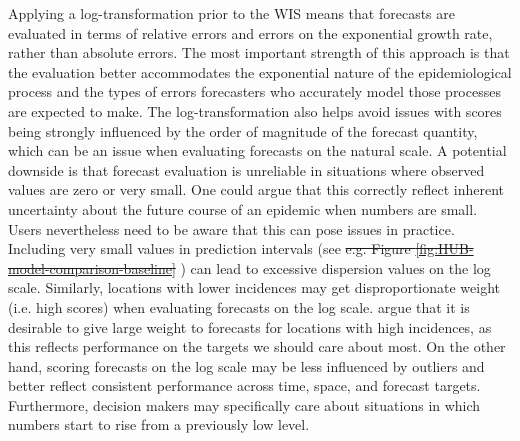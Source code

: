 \documentclass[10pt,letterpaper]{article} %
\providecommand{\DIFaddtex}[1]{{\protect\color{blue}\uwave{#1}}} %
\providecommand{\DIFdeltex}[1]{{\protect\color{red}\sout{#1}}}                      %
\providecommand{\DIFaddbegin}{} %
\providecommand{\DIFaddend}{} %
\providecommand{\DIFdelbegin}{} %
\providecommand{\DIFdelend}{} %
\providecommand{\DIFadd}[1]{\texorpdfstring{\DIFaddtex{#1}}{#1}} %
\providecommand{\DIFdel}[1]{\texorpdfstring{\DIFdeltex{#1}}{}} %
\newcommand{\DIFscaledelfig}{0.5}
\newlength{\DIFdelgraphicswidth} %
\newlength{\DIFdelgraphicsheight} %
\newcommand{\DIFaddincludegraphics}[2][]{{\color{blue}\fbox{\DIFOincludegraphics[#1]{#2}}}} %
\newcommand{\DIFdelincludegraphics}[2][]{%
\sbox{\DIFdelgraphicsbox}{\DIFOincludegraphics[#1]{#2}}%
\settoboxwidth{\DIFdelgraphicswidth}{\DIFdelgraphicsbox} %
\settoboxtotalheight{\DIFdelgraphicsheight}{\DIFdelgraphicsbox} %
\scalebox{\DIFscaledelfig}{%
\parbox[b]{\DIFdelgraphicswidth}{\usebox{\DIFdelgraphicsbox}\\[-\baselineskip] \rule{\DIFdelgraphicswidth}{0em}}\llap{\resizebox{\DIFdelgraphicswidth}{\DIFdelgraphicsheight}{%
\setlength{\unitlength}{\DIFdelgraphicswidth}%
\begin{picture}(1,1)%
\thicklines\linethickness{2pt} %
{\color[rgb]{1,0,0}\put(0,0){\framebox(1,1){}}}%
{\color[rgb]{1,0,0}\put(0,0){\line( 1,1){1}}}%
{\color[rgb]{1,0,0}\put(0,1){\line(1,-1){1}}}%
\end{picture}%
}\hspace*{3pt}}} %
} %
\DeclareRobustCommand{\DIFaddbegin}{\DIFOaddbegin \let\includegraphics\DIFaddincludegraphics} %
\DeclareRobustCommand{\DIFaddend}{\DIFOaddend \let\includegraphics\DIFOincludegraphics} %
\DeclareRobustCommand{\DIFdelbegin}{\DIFOdelbegin \let\includegraphics\DIFdelincludegraphics} %
\DeclareRobustCommand{\DIFdelend}{\DIFOaddend \let\includegraphics\DIFOincludegraphics} %
\begin{document}
Applying a log-transformation prior to the WIS means that forecasts are evaluated in terms of relative errors and errors on the exponential growth rate, rather than absolute errors. The most important strength of this approach is that the evaluation better accommodates the exponential nature of the epidemiological process and the types of errors forecasters who accurately model those processes are expected to make. The log-transformation also helps avoid issues with scores being strongly influenced by the order of magnitude of the forecast quantity, which can be an issue when evaluating forecasts on the natural scale. 
A potential downside is that forecast evaluation is unreliable in situations where observed values are zero or very small. One could argue that this correctly reflect inherent uncertainty about the future course of an epidemic when numbers are small. Users nevertheless need to be aware that this can pose issues in practice. Including very small values in prediction intervals (see \DIFdelbegin \DIFdel{e.g. Figure \ref{fig:HUB-model-comparison-baseline}}\DIFdelend \DIFaddbegin {} \DIFadd{for an example}\DIFaddend ) can lead to excessive dispersion values on the log scale. 
Similarly, locations with lower incidences may get disproportionate weight (i.e. high scores) when evaluating forecasts on the log scale. \cite{bracherEvaluatingEpidemicForecasts2021} argue that it is desirable to give large weight to forecasts for locations with high incidences, as this reflects performance on the targets we should care about most. On the other hand, scoring forecasts on the log scale may be less influenced by outliers and better reflect consistent performance across time, space, and forecast targets. Furthermore, decision makers may specifically care about situations in which numbers start to rise from a previously low level.
\end{document}
